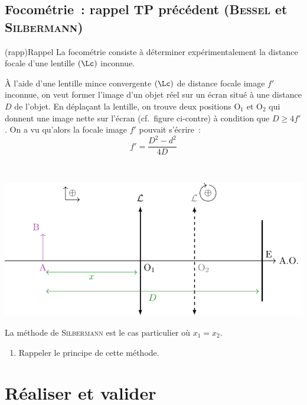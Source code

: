 \documentclass[../main/main.tex]{subfiles}
\begin{document}
\subsection{Focométrie~: rappel TP précédent (\textsc{Bessel} et
	\textsc{Silbermann})}

\begin{tcb}(rapp){Rappel}
	La focométrie consiste à déterminer expérimentalement la distance focale
	d'une lentille $(\Lc)$ inconnue.
\end{tcb}

\noindent
\begin{minipage}[t]{.6\linewidth}
	À l'aide d'une lentille mince convergente $(\Lc)$ de distance focale
	image $f'$ inconnue, on veut former l'image d'un objet réel sur un écran
	situé à une distance $D$ de l'objet. En déplaçant la lentille, on trouve
	deux positions O$_1$ et O$_2$ qui donnent une image nette sur l'écran (cf.\
	figure ci-contre) à condition que $D \geq 4f'$. On a vu qu'alors la focale
	image $f'$ pouvait s'écrire~:
	\[
		f' = \dfrac{D^2-d^2}{4D}
	\]
\end{minipage}
\hfill
\begin{minipage}[t]{.38\linewidth}
	~
	\begin{center}
		\includegraphics[width=\linewidth]{lent_conv-condition_bessel}
	\end{center}
\end{minipage}

La méthode de \textsc{Silbermann} est le cas particulier où $x_1 = x_2$.
\begin{enumerate}[label=\clenumi, start=2]
	\item Rappeler le principe de cette méthode.
\end{enumerate}

\section{Réaliser et valider}
\end{document}
